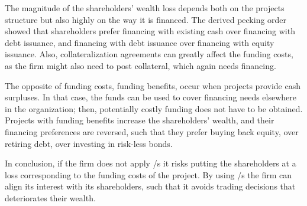 \documentclass[main.tex]{subfiles}
\begin{document}
    The magnitude of the shareholders' wealth loss depends both on the projects structure
    but also highly on the way it is financed. 
    The derived pecking order showed that shareholders prefer 
    financing with existing cash over financing with debt issuance, 
    and financing with debt issuance over financing with equity issuance.
    Also, collateralization agreements can greatly affect the funding costs,
    as the firm might also need to post collateral, which again needs financing.

    The opposite of funding costs, funding benefits, occur when projects provide cash surpluses.
    In that case, the funds can be used to cover financing needs elsewhere in the organization;
    then, potentially costly funding does not have to be obtained.
    \\
    Projects with funding benefits increase the shareholders' wealth,
    and their financing preferences are reversed, 
    such that they prefer buying back equity, over retiring debt, over investing in risk-less bonds.

    In conclusion, if the firm does not apply \FVA/s it risks putting the shareholders at a loss
    corresponding to the funding costs of the project.
    By using \FVA/s the firm can align its interest with its shareholders,
    such that it avoids trading decisions that deteriorates their wealth. 
\end{document}
